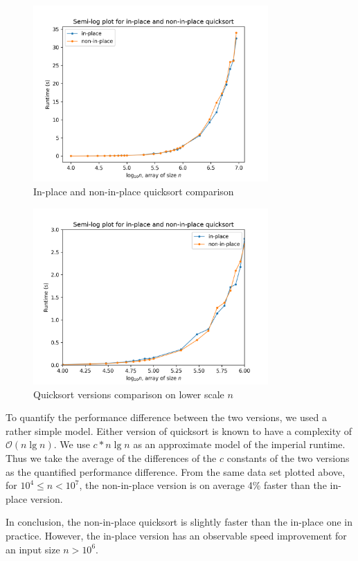 \documentclass[titlepage, 12pt]{article}
\begin{document}
\begin{figure}[h]
  \centering
  \includegraphics[width=0.8\textwidth]{ip-ax}
  \caption{In-place and non-in-place quicksort comparison}
  \label{fig:ip-ax}
\end{figure}
\begin{figure}[h]
  \centering
  \includegraphics[width=0.8\textwidth]{ip-ax-zoomed} 
  \caption{Quicksort versions comparison on lower scale \( n \)}
  \label{fig:ip-ax-zoomed}
\end{figure}

To quantify the performance difference between the two versions, we used a
rather simple model. Either version of quicksort is known to have a complexity
of \( \mathcal{O}(n\lg{n}) \). We use \( c * n\lg{n} \) as an approximate model
of the imperial runtime. Thus we take the average of the differences of the \( c
\) constants of the two versions as the quantified performance difference. From
the same data set plotted above, for \( 10^4 \leq n < 10^7 \), the non-in-place
version is on average 4\% faster than the in-place version.

In conclusion, the non-in-place quicksort is slightly faster than the in-place
one in practice. However, the in-place version has an observable speed
improvement for an input size \( n > 10^6 \).
\end{document}
